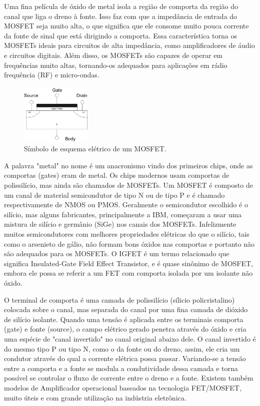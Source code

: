 \documentclass[12pt]{article}
\begin{document}
    Uma fina película de óxido de metal isola a região de comporta da região do canal que liga o dreno à fonte. Isso faz com que a impedância de entrada do MOSFET seja muito alta, o que significa que ele consome muito pouca corrente da fonte de sinal que está dirigindo a comporta. Essa característica torna os MOSFETs ideais para circuitos de alta impedância, como amplificadores de áudio e circuitos digitais. Além disso, os MOSFETs são capazes de operar em frequências muito altas, tornando-os adequados para aplicações em rádio frequência (RF) e micro-ondas.

        \begin{figure}[htpb!]

            \centering
            \includegraphics[width=0.3\textwidth]{./images/FET_cross_section.png}
            \caption{Símbolo de esquema elétrico de um MOSFET.}

        \end{figure}

    A palavra "metal" no nome é um anacronismo vindo dos primeiros chips, onde as comportas (gates) eram de metal. Os chips modernos usam comportas de polissilício, mas ainda são chamados de MOSFETs. Um MOSFET é composto de um canal de material semicondutor de tipo N ou de tipo P e é chamado respectivamente de NMOS ou PMOS. Geralmente o semicondutor escolhido é o silício, mas alguns fabricantes, principalmente a IBM, começaram a usar uma mistura de silício e germânio (SiGe) nos canais dos MOSFETs. Infelizmente muitos semicondutores com melhores propriedades elétricas do que o silício, tais como o arsenieto de gálio, não formam bons óxidos nas comportas e portanto não são adequados para os MOSFETs. O IGFET é um termo relacionado que significa Insulated-Gate Field Effect Transistor, e é quase sinônimo de MOSFET, embora ele possa se referir a um FET com comporta isolada por um isolante não óxido.

    O terminal de comporta é uma camada de polissilício (sílicio policristalino) colocada sobre o canal, mas separada do canal por uma fina camada de dióxido de silício isolante. Quando uma tensão é aplicada entre os terminais comporta (gate) e fonte (source), o campo elétrico gerado penetra através do óxido e cria uma espécie de "canal invertido" no canal original abaixo dele. O canal invertido é do mesmo tipo P ou tipo N, como o da fonte ou do dreno, assim, ele cria um condutor através do qual a corrente elétrica possa passar. Variando-se a tensão entre a comporta e a fonte se modula a condutividade dessa camada e torna possível se controlar o fluxo de corrente entre o dreno e a fonte. Existem também modelos de Amplificador operacional baseados na tecnologia FET/MOSFET, muito úteis e com grande utilização na indústria eletrônica.
\end{document}
